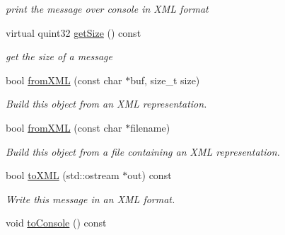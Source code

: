 \begin{DoxyCompactItemize}
\begin{DoxyCompactList}\small\item\em print the message over console in X\+ML format \end{DoxyCompactList}\item 
virtual quint32 \hyperlink{classMAPEMMessage_ad3c86311a46c1b0e34cdbe2fdbded5c7}{get\+Size} () const 
\begin{DoxyCompactList}\small\item\em get the size of a message \end{DoxyCompactList}\item 
bool \hyperlink{classMAPEMMessage_ad1fc63cd364ef58ab27c9ac3a42122a0}{from\+X\+ML} (const char $\ast$buf, size\+\_\+t size)
\begin{DoxyCompactList}\small\item\em Build this object from an X\+ML representation. \end{DoxyCompactList}\item 
bool \hyperlink{classMAPEMMessage_af90b14a96b380560ed0879006afe2313}{from\+X\+ML} (const char $\ast$filename)
\begin{DoxyCompactList}\small\item\em Build this object from a file containing an X\+ML representation. \end{DoxyCompactList}\item 
bool \hyperlink{classMAPEMMessage_a42a1a7ace752abd6807c246ed8e0be36}{to\+X\+ML} (std\+::ostream $\ast$out) const 
\begin{DoxyCompactList}\small\item\em Write this message in an X\+ML format. \end{DoxyCompactList}\item 
void \hyperlink{classMAPEMMessage_aa3a135eb2b1ede842cb27f15ffb47b8b}{to\+Console} () const \hypertarget{classMAPEMMessage_aa3a135eb2b1ede842cb27f15ffb47b8b}{}\label{classMAPEMMessage_aa3a135eb2b1ede842cb27f15ffb47b8b}


\end{DoxyCompactItemize}
